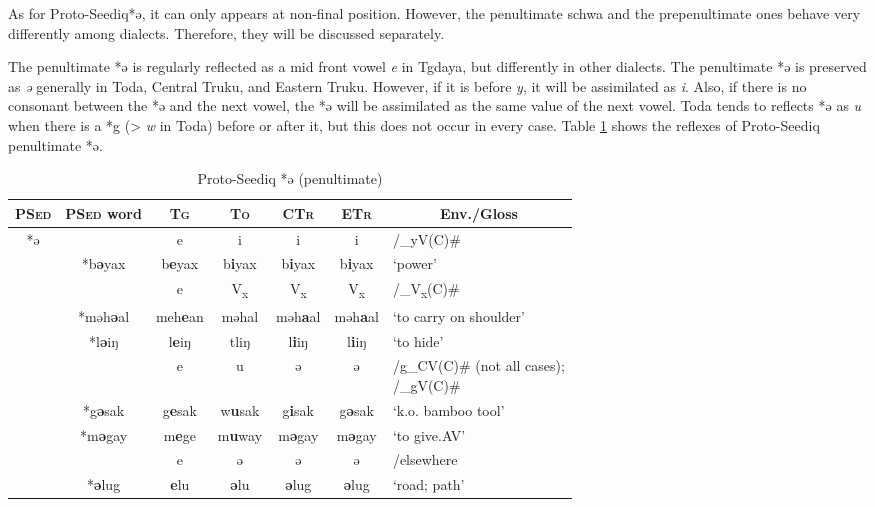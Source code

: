 \documentclass[12pt]{article}
\newcommand{\psed}{\textsc{PSed}\xspace}
\newcommand{\psedf}{Proto-Seediq\xspace}
\newcommand{\stg}{\textsc{Tg}\xspace}
\newcommand{\sto}{\textsc{To}\xspace}
\newcommand{\stof}{Toda\xspace}
\newcommand{\sctr}{\textsc{CTr}\xspace}
\newcommand{\sctrf}{Central Truku\xspace}
\newcommand{\setr}{\textsc{ETr}\xspace}
\newcommand{\setrf}{Eastern Truku\xspace}
\begin{document}
As for \psedf *ə, it can only appears at non-final position. However, the penultimate schwa and the prepenultimate ones behave very differently among dialects. Therefore, they will be discussed separately. 

The penultimate *ə is regularly reflected as a mid front vowel \textit{e} in Tgdaya, but differently in other dialects. The penultimate *ə is preserved as \textit{ə} generally in \stof, \sctrf, and \setrf. However, if it is before \textit{y}, it will be assimilated as \textit{i}. Also, if there is no consonant between the *ə and the next vowel, the *ə will be assimilated as the same value of the next vowel. \stof tends to reflects *ə as \textit{u} when there is a *g (> \textit{w} in \stof) before or after it, but this does not occur in every case.  Table \ref{tab:pschwa} shows the reflexes of \psedf penultimate *ə. 

\begin{table}[!htbp]
\centering
\caption{Proto-Seediq *ə (penultimate)}
\label{tab:pschwa}
\begin{tabular}{c|c|cccc|l}
\textbf{\psed} & \textbf{\psed word}      & \textbf{\stg} & \textbf{\sto} & \textbf{\sctr} & \textbf{\setr} & \multicolumn{1}{c}{\textbf{Env./Gloss}} \\ \hline
\multirow{10}{*}{*ə} & & e                  & i                  & i                  & i                  & /\_yV(C)\#            \\  \cline{2-7}
                    & *b\textbf{ə}yax & b\textbf{e}yax & b\textbf{i}yax & b\textbf{i}yax & b\textbf{i}yax & `power' \\ \cline{2-7}
                    & & e                  & V\textsubscript{x} & V\textsubscript{x} & V\textsubscript{x} & /\_V\textsubscript{x}(C)\#        \\ \cline{2-7}
                    & *məh\textbf{ə}al & meh\textbf{e}an & məhal & məh\textbf{a}al & məh\textbf{a}al & `to carry on shoulder' \\
                    & *l\textbf{ə}iŋ & l\textbf{e}iŋ & tliŋ & l\textbf{i}iŋ & l\textbf{i}iŋ & `to hide' \\ \cline{2-7}
                    & & e                  & u                  & ə                  & ə                  & \makecell[l]{/g\_CV(C)\# (not all cases);\\/\_gV(C)\#}           \\ \cline{2-7}
                    & *g\textbf{ə}sak & g\textbf{e}sak & w\textbf{u}sak & g\textbf{i}sak & g\textbf{ə}sak & `k.o. bamboo tool' \\
                    & *m\textbf{ə}gay & m\textbf{e}ge & m\textbf{u}way & m\textbf{ə}gay & m\textbf{ə}gay & `to give.AV' \\ \cline{2-7}
                    & & e                  & ə                  & ə                  & ə                  & /elsewhere                        \\ \cline{2-7}
                    & *\textbf{ə}lug & \textbf{e}lu & \textbf{ə}lu & \textbf{ə}lug & \textbf{ə}lug & `road; path' \\ \hline
\end{tabular}
\end{table}
\end{document}
